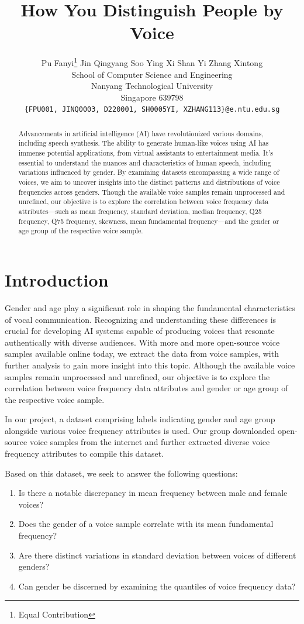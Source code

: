 \documentclass{article}
\title{How You Distinguish People by Voice}
\author{%
	Pu Fanyi\thanks{Equal Contribution} \hspace{1em} Jin Qingyang\footnotemark[1] \hspace{1em} Soo Ying Xi\footnotemark[1] \hspace{1em} Shan Yi\footnotemark[1] \hspace{1em} Zhang Xintong\footnotemark[1] \\
	School of Computer Science and Engineering\\
	Nanyang Technological University\\
	Singapore 639798 \\
	\texttt{\{FPU001, JINQ0003, D220001, SH0005YI, XZHANG113\}@e.ntu.edu.sg} \\
}
\begin{document}
	
	
	\newpage
	
	
	\maketitle
	
	
	\begin{abstract}
		Advancements in artificial intelligence (AI) have revolutionized various domains, including speech synthesis. The ability to generate human-like voices using AI has immense potential applications, from virtual assistants to entertainment media. It's essential to understand the nuances and characteristics of human speech, including variations influenced by gender. By examining datasets encompassing a wide range of voices, we aim to uncover insights into the distinct patterns and distributions of voice frequencies across genders. Though the available voice samples remain unprocessed and unrefined, our objective is to explore the correlation between voice frequency data attributes—such as mean frequency, standard deviation, median frequency, Q25 frequency, Q75 frequency, skewness, mean fundamental frequency—and the gender or age group of the respective voice sample.
	\end{abstract}
	
	
	\section{Introduction}
	Gender and age play a significant role in shaping the fundamental characteristics of vocal communication. Recognizing and understanding these differences is crucial for developing AI systems capable of producing voices that resonate authentically with diverse audiences. With more and more open-source voice samples available online today, we extract the data from voice samples, with further analysis to gain more insight into this topic. Although the available voice samples remain unprocessed and unrefined, our objective is to explore the correlation between voice frequency data attributes and gender or age group of the respective voice sample.
	
	In our project, a dataset comprising labels indicating gender and age group alongside various voice frequency attributes is used. Our group downloaded open-source voice samples from the internet and further extracted diverse voice frequency attributes to compile this dataset.
	
	Based on this dataset, we seek to answer the following questions:
	\begin{enumerate}
		\item Is there a notable discrepancy in mean frequency between male and female voices?
		\item Does the gender of a voice sample correlate with its mean fundamental frequency?
		\item Are there distinct variations in standard deviation between voices of different genders?
		\item Can gender be discerned by examining the quantiles of voice frequency data?
	\end{enumerate}
	
\end{document}
